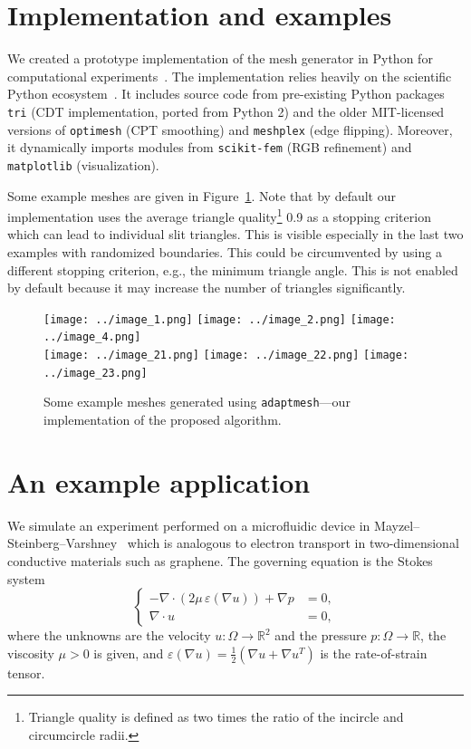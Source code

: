 \documentclass[12pt]{article}
\begin{document}
\section{Implementation and examples}

We created a prototype implementation of the mesh generator in Python for
computational experiments~\cite{adaptmesh2020}.  The implementation relies
heavily on the scientific Python ecosystem~\cite{virtanen2020scipy}.  It
includes source code from pre-existing Python packages \verb|tri| \cite{tri}
(CDT implementation, ported from Python 2) and the older MIT-licensed versions of
\verb|optimesh| \cite{optimesh} (CPT smoothing) and \verb|meshplex|
\cite{meshplex} (edge flipping).  Moreover, it dynamically imports modules from
\verb|scikit-fem| \cite{gustafsson2020scikit} (RGB refinement) and
\verb|matplotlib| \cite{hunter2007matplotlib} (visualization).

Some example meshes are given in Figure~\ref{fig:moreexamples}.  Note that by
default our implementation uses the average triangle quality\footnote{Triangle
quality is defined as two times the ratio of the incircle and circumcircle
radii.} 0.9 as a stopping criterion which can lead to individual slit triangles.
This is visible especially in the last two examples with randomized boundaries.
This could be circumvented by using a different stopping criterion, e.g., the
minimum triangle angle.  This is not enabled by default because it may increase the
number of triangles significantly.

\begin{figure}[htbp]
  \centering
  \texttt{[image: ../image\_1.png]}
  \texttt{[image: ../image\_2.png]}
  \texttt{[image: ../image\_4.png]}\\
  \texttt{[image: ../image\_21.png]}
  \texttt{[image: ../image\_22.png]}
  \texttt{[image: ../image\_23.png]}
  \caption{Some example meshes generated using \texttt{adaptmesh}---our
    implementation of the proposed algorithm.}
\label{fig:moreexamples}
\end{figure}

\section{An example application}

We simulate an experiment performed on a microfluidic device in
Mayzel--Steinberg--Varshney~\cite{mayzel2019stokes} which is analogous to
electron transport in two-dimensional conductive materials such as graphene.
The governing equation is the Stokes system
\begin{equation}
  \left\{
  \begin{aligned}
    -\nabla \cdot (2\mu\,\varepsilon(\nabla u)) + \nabla p &= 0, \\
    \nabla \cdot u &= 0,
  \end{aligned}
  \right.
\end{equation}
where the unknowns are the velocity $u : \Omega \rightarrow \mathbb{R}^2$ and
the pressure $p : \Omega \rightarrow \mathbb{R}$, the viscosity $\mu > 0$ is
given, and $\varepsilon(\nabla u) = \tfrac12(\nabla u + \nabla u^T)$ is the
rate-of-strain tensor.
\end{document}
